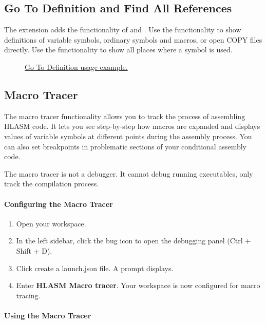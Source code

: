 \subsection{Go To Definition and Find All References}
The extension adds the functionality of  and . Use the  functionality to show definitions of variable symbols, ordinary symbols and macros, or open COPY files directly. Use the  functionality to show all places where a symbol is used.

\begin{figure}[H]
	\centering
	\caption{\href{https://github.com/eclipse/che-che4z-lsp-for-hlasm/blob/master/readme\_res/go\_to\_def.gif}{Go To Definition usage example.}}
\end{figure}

\subsection{Macro Tracer}
The macro tracer functionality allows you to track the process of assembling HLASM code. It lets you see step-by-step how macros are expanded and displays values of variable symbols at different points during the assembly process. You can also set breakpoints in problematic sections of your conditional assembly code. 

The macro tracer is not a debugger. It cannot debug running executables, only track the compilation process.

\paragraph{Configuring the Macro Tracer}

\begin{enumerate}
	\item Open your workspace.
	\item In the left sidebar, click the bug icon to open the debugging panel (Ctrl + Shift + D).
	\item Click create a launch.json file. A  prompt displays.
	\item Enter \textbf{HLASM Macro tracer}. Your workspace is now configured for macro tracing.
\end{enumerate}

\paragraph{Using the Macro Tracer}

